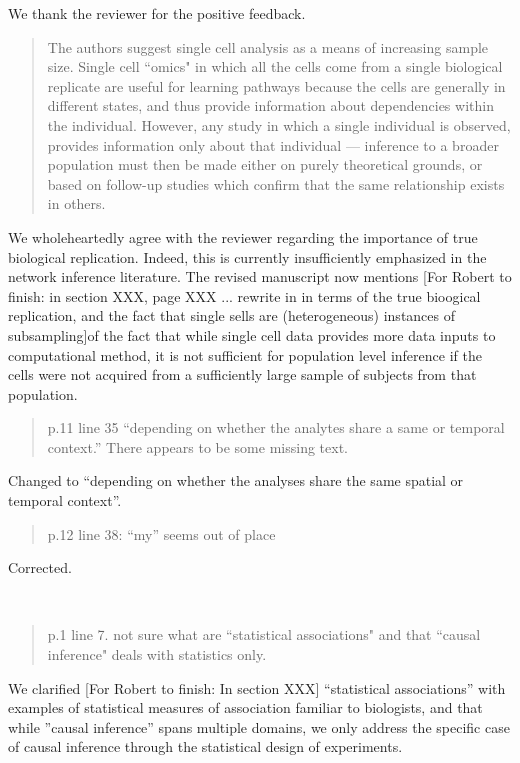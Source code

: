 \documentclass{letter}[11]
\def\todo#1{{\color{red}[For Robert to finish: #1]}}
\def\r#1{{\begin{quote}\textsf{\color{blue} #1}\end{quote}}}
\begin{document}
We thank the reviewer for the positive feedback.

\r{The authors suggest single cell analysis as a means of increasing sample size. Single cell ``omics" in which all the cells come from a single biological replicate are useful for learning pathways because the cells are generally in different states, and thus provide information about dependencies within the individual. However, any study in which a single individual is observed, provides information only about that individual --- inference to a broader population must then be made either on purely theoretical grounds, or based on follow-up studies which confirm that the same relationship exists in others.}

We wholeheartedly agree with the reviewer regarding the importance of true biological replication. Indeed, this is currently insufficiently emphasized in the network inference literature. The revised manuscript now mentions \todo{in section XXX, page XXX ... rewrite in in terms of the true bioogical replication, and the fact that single sells are (heterogeneous) instances of subsampling}of the fact that while single cell data provides more data inputs to computational method, it is not sufficient for population level inference if the cells were not acquired from a sufficiently large sample of subjects from that population.

\r{p.11 line 35 ``depending on whether the analytes share a same or temporal context.'' There appears to be some missing text.}

Changed to ``depending on whether the analyses share the same spatial or temporal context''.

\r{p.12 line 38: ``my'' seems out of place}

Corrected.


\newpage
\normalcolor
{} 
\vspace{3mm} \\

\r{p.1 line 7. not sure what are ``statistical associations" and that ``causal inference" deals with statistics only.}

We clarified \todo{In section XXX}  ``statistical associations'' with examples of statistical measures of association familiar to biologists, and that while ''causal inference'' spans multiple domains, we only address the specific case of causal inference through the statistical design of experiments.
\end{document}
